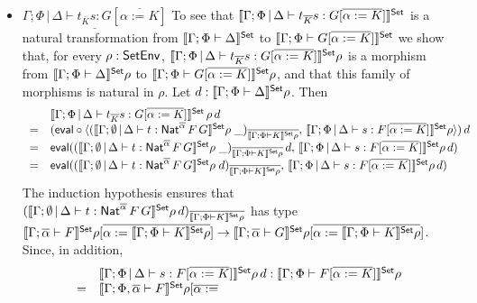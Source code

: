 \documentclass{lmcs}
\theoremstyle{plain}\newtheorem{satz}[thm]{Satz}
\begin{document}
\begin{itemize}
\item 
$\underline{\Gamma;\Phi \,|\, \Delta \vdash t_{\overline K} s: G
  [\overline{\alpha := K}]}$\; 
  To see that $\llbracket{\Gamma;\Phi \,|\,
  \Delta \vdash t_{\overline K} s: G [\overline{\alpha := K}]}\rrbracket^{\mathsf{Set}}$ is a
  natural transformation from $\llbracket{\Gamma; \Phi \vdash \Delta}\rrbracket^{\mathsf{Set}}$ to
  $\llbracket{\Gamma;\Phi \vdash G [\overline{\alpha := K}]}\rrbracket^{\mathsf{Set}}$ we 
  show that, for every $\rho : \mathsf{SetEnv}$, $\llbracket{\Gamma;\Phi \,|\,
    \Delta \vdash t_{\overline K} s: G [\overline{\alpha := K}]}\rrbracket^{\mathsf{Set}}\rho$
  is a morphism from $\llbracket{\Gamma; \Phi \vdash \Delta}\rrbracket^{\mathsf{Set}}\rho$ to
  $\llbracket{\Gamma;\Phi \vdash G [\overline{\alpha := K}]}\rrbracket^{\mathsf{Set}}\rho$, and
  that this family of morphisms is natural in $\rho$. Let $d :
  \llbracket{\Gamma; \Phi \vdash \Delta}\rrbracket^{\mathsf{Set}}\rho$. Then
  \[\begin{array}{ll}
  & \llbracket{\Gamma;\Phi \,|\, \Delta \vdash t_{\overline K} s: G
  [\overline{\alpha := K}]}\rrbracket^{\mathsf{Set}}\,\rho\,d\\
= & (\mathsf{eval} \circ \langle (\llbracket{\Gamma; \emptyset \,|\, \Delta \vdash
  t : \mathsf{Nat}^{\overline{\alpha}} \,F \,G}\rrbracket^{\mathsf{Set}}\rho\;
\_)_{\overline{\llbracket{\Gamma;\Phi \vdash K}\rrbracket^{\mathsf{Set}}\rho}},\,
\llbracket{\Gamma;\Phi \,|\, \Delta \vdash s: F [\overline{\alpha :=
      K}]}\rrbracket^{\mathsf{Set}}\rho \rangle)\,d\\
= & \mathsf{eval} ((\llbracket{\Gamma; \emptyset \,|\, \Delta \vdash t :
  \mathsf{Nat}^{\overline{\alpha}} \,F \,G}\rrbracket^{\mathsf{Set}}\rho\;
\_)_{\overline{\llbracket{\Gamma;\Phi \vdash K}\rrbracket^{\mathsf{Set}}\rho}} \,d,\,
\llbracket{\Gamma;\Phi \,|\, \Delta \vdash s: F [\overline{\alpha :=
      K}]}\rrbracket^{\mathsf{Set}}\rho\, d)\\
= & \mathsf{eval} ((\llbracket{\Gamma; \emptyset \,|\, \Delta \vdash t :
  \mathsf{Nat}^{\overline{\alpha}} \,F \,G}\rrbracket^{\mathsf{Set}}\rho\;
d)_{\overline{\llbracket{\Gamma;\Phi \vdash K}\rrbracket^{\mathsf{Set}}\rho}},\,
\llbracket{\Gamma;\Phi \,|\, \Delta \vdash s: F [\overline{\alpha :=
      K}]}\rrbracket^{\mathsf{Set}}\rho\, d)\\
\end{array}\]
The induction hypothesis ensures that $(\llbracket{\Gamma; \emptyset \,|\,
  \Delta \vdash t : \mathsf{Nat}^{\overline{\alpha}} \,F \,G}\rrbracket^{\mathsf{Set}}\rho\,
d)_{\overline{\llbracket{\Gamma;\Phi \vdash K}\rrbracket^{\mathsf{Set}}\rho}}$ has type
$\llbracket{\Gamma; \overline{\alpha} \vdash F}\rrbracket^{\mathsf{Set}}\rho[\overline{\alpha :=
    \llbracket{\Gamma;\Phi \vdash K}\rrbracket^{\mathsf{Set}}\rho}] \to \llbracket{\Gamma;
  \overline{\alpha} \vdash G}\rrbracket^{\mathsf{Set}}\rho[\overline{\alpha := \llbracket{\Gamma;\Phi \vdash
      K}\rrbracket^{\mathsf{Set}}\rho}]$.  Since, in addition, 
\[\begin{array}{ll}
  &\llbracket{\Gamma;\Phi \,|\,
  \Delta \vdash s: F [\overline{\alpha := K}]}\rrbracket^{\mathsf{Set}}\rho\, d :
\llbracket{\Gamma; \Phi \vdash F[\overline{\alpha := K}]}\rrbracket^{\mathsf{Set}}\rho \\ 
  =&\llbracket{\Gamma; \Phi, \overline{\alpha} \vdash F}\rrbracket^{\mathsf{Set}}\rho[\overline{\alpha :=
}
\end{array}\]
\end{itemize}
\end{document}
